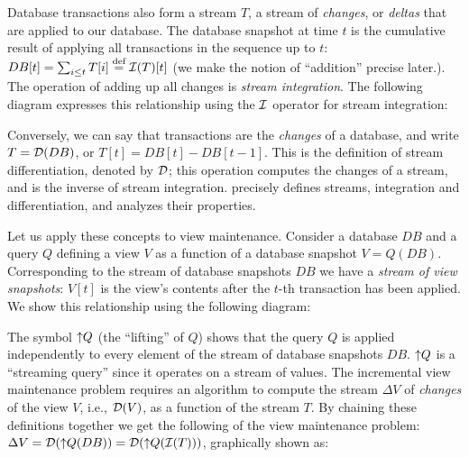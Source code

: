 Database transactions also form a stream $T$, a stream of \emph{changes},
or \emph{deltas} that are applied to our database.   
The database snapshot at time $t$ is the cumulative result of applying all 
transactions in the sequence up to $t$: $DB[t] = \sum_{i \leq t} T[i] \stackrel{\textrm{\scriptsize def}}{=} \mathcal{I}(T)[t]$ (we make the notion of ``addition'' precise later.).
The operation of adding up all changes is \emph{stream integration}.
The following diagram expresses this relationship using the $\mathcal{I}$ operator for 
stream integration:

\begin{center}
\end{center}

Conversely, we can say that transactions are the \emph{changes} of a database, and write
$T = \mathcal{D}(DB)$, or $T[t] = DB[t] - DB[t-1]$.  This is the definition of stream differentiation, denoted by $\mathcal{D}$; this 
operation computes the changes of a stream, and is the 
inverse of stream integration.  
precisely defines streams, integration and differentiation, and analyzes
their properties. 

Let us apply these concepts to view maintenance.
Consider a database $DB$ and a query $Q$ defining a view $V$ as a function
of a database snapshot $V = Q(DB)$.  Corresponding to the stream of database snapshots
$DB$ we have a \emph{stream of view snapshots}: $V[t]$ is the
view's contents after the $t$-th transaction has been applied.  We show this
relationship using the following diagram:

\begin{center}
\end{center}

The symbol ${\uparrow}Q$ (the ``lifting'' of $Q$) shows that the query $Q$ is applied
independently to every element of the stream of database snapshots $DB$.  
${\uparrow}Q$ is a ``streaming query'' since it operates on a stream of values.
The incremental view maintenance problem requires an algorithm to  
compute the stream $\Delta V$ of \emph{changes} of the view $V$, i.e., $\mathcal{D}(V)$,
as a function of the stream $T$.  
By chaining these definitions together we get the following 
of the view maintenance problem: $\Delta V = \mathcal{D}({\uparrow}Q(DB)) = \mathcal{D}({\uparrow}Q(\mathcal{I}(T)))$,
graphically shown as:

